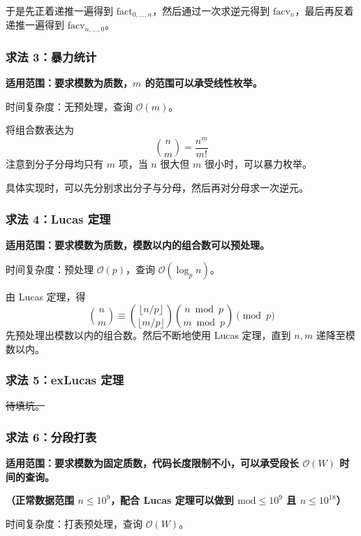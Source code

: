于是先正着递推一遍得到 $\mathrm{fact}_{0, \dots, n}$，然后通过一次求逆元得到 $\mathrm{facv}_n$，最后再反着递推一遍得到 $\mathrm{facv}_{n, \dots, 0}$。


\subsubsection{求法 3：暴力统计}

\begin{quoteblock}
\textbf{适用范围：要求模数为质数，$m$ 的范围可以承受线性枚举。}

时间复杂度：无预处理，查询 $\mathcal{O}(m)$。
\end{quoteblock}

将组合数表达为
\[
\binom{n}{m} = \frac{n^{\underline{m}}}{m!}
\]
注意到分子分母均只有 $m$ 项，当 $n$ 很大但 $m$ 很小时，可以暴力枚举。

具体实现时，可以先分别求出分子与分母，然后再对分母求一次逆元。

\subsubsection{求法 4：Lucas 定理}

\begin{quoteblock}
\textbf{适用范围：要求模数为质数，模数以内的组合数可以预处理。}

时间复杂度：预处理 $\mathcal{O}(p)$，查询 $\mathcal{O}(\log_{p} n)$。
\end{quoteblock}

由 Lucas 定理，得
\[
\binom{n}{m} \equiv \binom{\lfloor n / p \rfloor}{\lfloor m / p \rfloor}\binom{n \bmod p}{m \bmod p} \pmod p
\]
先预处理出模数以内的组合数。然后不断地使用 Lucas 定理，直到 $n, m$ 递降至模数以内。

\subsubsection{求法 5：exLucas 定理}

\sout{待填坑。}

\subsubsection{求法 6：分段打表}

\begin{quoteblock}
\textbf{适用范围：要求模数为固定质数，代码长度限制不小，可以承受段长 $\mathcal{O}(W)$ 时间的查询。}

\textbf{（正常数据范围 $n \leq 10^9$，配合 Lucas 定理可以做到 $\mathrm{mod} \leq 10^9$ 且 $n \leq 10^{18}$）}

时间复杂度：打表预处理，查询 $\mathcal{O}(W)$。
\end{quoteblock}


